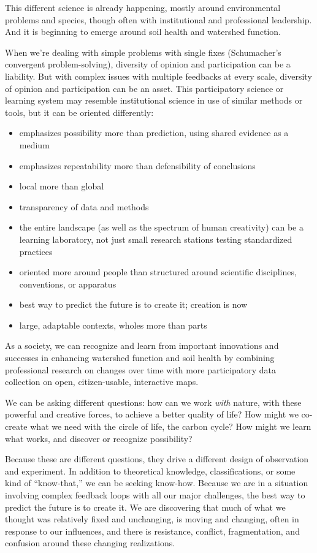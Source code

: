 \documentclass[11pt,letterpaper,twoside,onecolumn]{memoir}
\begin{document}
This different science is already happening, mostly around environmental problems and species, though often with institutional and professional leadership. And it is beginning to emerge around soil health and watershed function.

When we're dealing with simple problems with single fixes (Schumacher's convergent problem-solving), diversity of opinion and participation can be a liability. But with complex issues with multiple feedbacks at every scale, diversity of opinion and participation can be an asset. This participatory science or learning system may resemble institutional science in use of similar methods or tools, but it can be oriented differently:

\begin{itemize}

\item[] emphasizes possibility more than prediction, using shared evidence as a medium 
\item[] emphasizes repeatability more than defensibility of conclusions
\item[] local more than global
\item[] transparency of data and methods
\item[] the entire landscape (as well as the spectrum of human creativity) can be a learning laboratory, not just small research stations testing standardized practices
\item[] oriented more around people than structured around scientific disciplines, conventions, or apparatus
\item[] best way to predict the future is to create it; creation is now
\item[] large, adaptable contexts, wholes more than parts
\end{itemize}

As a society, we can recognize and learn from important innovations and successes in enhancing watershed function and soil health by combining professional research on changes over time with more participatory data collection on open, citizen-usable, interactive maps.

We can be asking different questions: how can we work \textit{with} nature, with these powerful and creative forces, to achieve a better quality of life? How might we co-create what we need with the circle of life, the carbon cycle? How might we learn what works, and discover or recognize possibility?

Because these are different questions, they drive a different design of observation and experiment.
In addition to theoretical knowledge, classifications, or some kind of ``know-that,'' we can be seeking know-how. Because we are in a situation involving complex feedback loops with all our major challenges, the best way to predict the future is to create it. We are discovering that much of what we thought was relatively fixed and unchanging, is moving and changing, often in response to our influences, and there is resistance, conflict, fragmentation, and confusion around these changing realizations.
\end{document}
